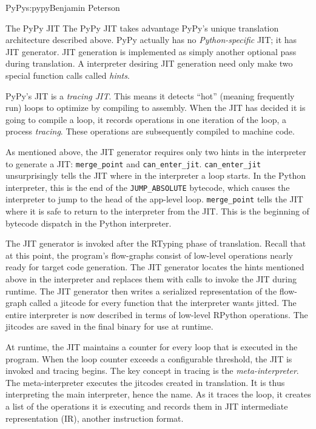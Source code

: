 \begin{aosachapter}{PyPy}{s:pypy}{Benjamin Peterson}
\begin{aosasect1}{The PyPy JIT}
The PyPy JIT takes advantage PyPy's unique translation architecture described
above. PyPy actually has no \emph{Python-specific} JIT; it has JIT
generator. JIT generation is implemented as simply another optional pass during
translation. A interpreter desiring JIT generation need only make two special
function calls called \emph{hints}.

PyPy's JIT is a \emph{tracing JIT}. This means it detects ``hot'' (meaning
frequently run) loops to optimize by compiling to assembly. When the JIT has
decided it is going to compile a loop, it records operations in one iteration of
the loop, a process \emph{tracing}. These operations are subsequently compiled
to machine code.

As mentioned above, the JIT generator requires only two hints in the interpreter
to generate a JIT: \verb+merge_point+ and
\verb+can_enter_jit+. \verb+can_enter_jit+ unsurprisingly tells the JIT where in
the interpreter a loop starts. In the Python interpreter, this is the end of the
\verb+JUMP_ABSOLUTE+ bytecode, which causes the interpreter to jump to the head
of the app-level loop. \verb+merge_point+ tells the JIT where it is safe to return to the
interpreter from the JIT. This is the beginning of bytecode dispatch in the
Python interpreter.

The JIT generator is invoked after the RTyping phase of translation. Recall that
at this point, the program's flow-graphs consist of low-level operations nearly
ready for target code generation. The JIT generator locates the hints mentioned
above in the interpreter and replaces them with calls to invoke the JIT during
runtime. The JIT generator then writes a serialized representation of the
flow-graph called a jitcode for every function that the interpreter wants
jitted. The entire interpreter is now described in terms of low-level RPython
operations. The jitcodes are saved in the final binary for use at runtime.

At runtime, the JIT maintains a counter for every loop that is executed in the
program. When the loop counter exceeds a configurable threshold, the JIT is
invoked and tracing begins. The key concept in tracing is the
\emph{meta-interpreter}. The meta-interpreter executes the jitcodes created in
translation. It is thus interpreting the main interpreter, hence the name. As it
traces the loop, it creates a list of the operations it is executing and records
them in JIT intermediate representation (IR), another instruction format.


\end{aosasect1}
\end{aosachapter}
